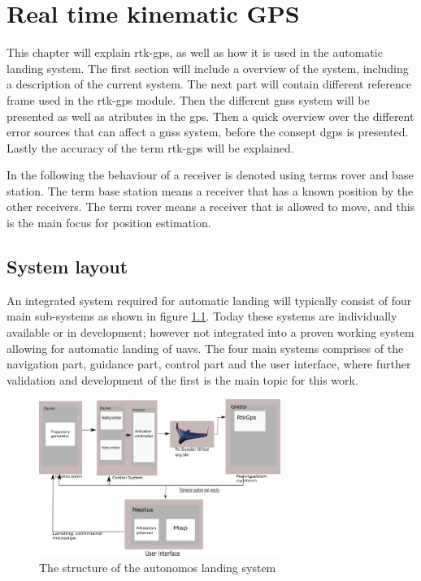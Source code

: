 
\chapter{Real time kinematic GPS}
This chapter will explain \acrfull{rtk-gps}, as well as how it is used in the automatic landing system. The first section will include a overview of the system, including a description of the current system. The next part will contain different reference frame used in the \gls{rtk-gps} module. Then the different \acrfull{gnss} system will be presented as well as atributes in the \acrfull{gps}. Then a quick overview over the different error sources that can affect a \gls{gnss} system, before the consept \acrfull{dgps} is presented. Lastly the accuracy of the term \gls{rtk-gps} will be explained.

In the following the behaviour of a receiver is denoted using terms rover and base station. The term base station means a receiver that has a known position by the other receivers. The term rover means a receiver that is allowed to move, and this is the main focus for position estimation.
\section{System layout}
An integrated system required for automatic landing will typically consist of four main sub-systems as shown in figure \ref{figure:SystemOverview}. Today these systems are individually available or in development; however not integrated into a proven working system allowing for automatic landing of \glspl{uav}. The four main systems comprises of the navigation part, guidance part, control part and the user interface, where further validation and development of the first is the main topic for this work.

\begin{figure}[H]
	\centering
		\includegraphics[width=0.7\textwidth]{figs/SystemOverview.png}
		\caption{The structure of the autonomos landing system}
		\label{figure:SystemOverview}
\end{figure}

